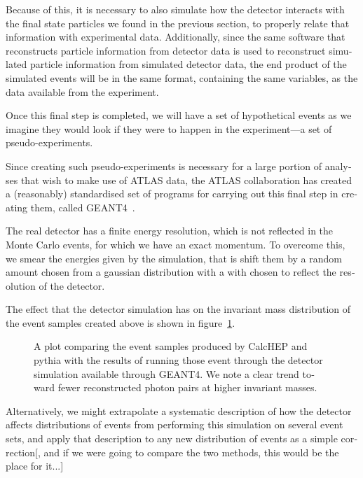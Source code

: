 \begin{english}
Because of this, it is necessary to also simulate how the detector interacts with the final state particles we found in the previous section, to properly relate that information with experimental data. Additionally, since the same software that reconstructs particle information from detector data is used to reconstruct simulated particle information from simulated detector data, the end product of the simulated events will be in the same format, containing the same variables, as the data available from the experiment.

Once this final step is completed, we will have a set of hypothetical events as we imagine they would look if they were to happen in the experiment---a set of pseudo-experiments.

Since creating such pseudo-experiments is necessary for a large portion of analyses that wish to make use of ATLAS data, the ATLAS collaboration has created a (reasonably) standardised set of programs for carrying out this final step in creating them, called GEANT4~\cite{geant4}.

The real detector has a finite energy resolution, which is not reflected in the Monte Carlo events, for which we have an exact momentum. To overcome this, we smear the energies given by the simulation, that is shift them by a random amount chosen from a gaussian distribution with a with chosen to reflect the resolution of the detector.

The effect that the detector simulation has on the invariant mass distribution of the event samples created above is shown in figure~\ref{geant-beaf}.

\begin{figure}[htp]
\begin{minipage}[b]{.69\textwidth}
\begin{infilsf} \tiny

\end{infilsf}
\end{minipage}
\hfill\begin{minipage}[b]{.3\textwidth}
\caption{A plot comparing the event samples produced by CalcHEP and pythia with the results of running those event through the detector simulation available through GEANT4. We note a clear trend toward fewer reconstructed photon pairs at higher invariant masses. \label{geant-beaf}}
\end{minipage}
\end{figure}

Alternatively, we might extrapolate a systematic description of how the detector affects distributions of events from performing this simulation on several event sets, and apply that description to any new distribution of events as a simple correction[, and if we were going to compare the two methods, this would be the place for it...]


\end{english}
